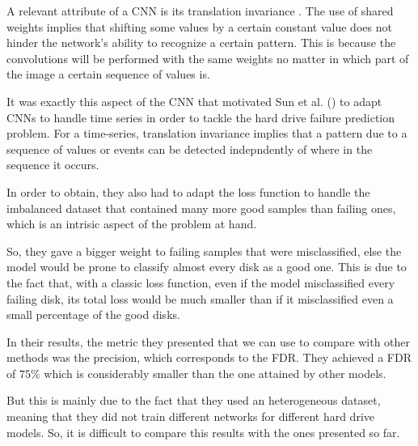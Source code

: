 A relevant attribute of a CNN is its translation invariance \cite{kayhan2020translation}.
The use of shared weights implies that shifting some values by a certain constant value does not hinder the network's ability to recognize a certain pattern.
This is because the convolutions will be performed with the same weights no matter in which part of the image a certain sequence of values is.

It was exactly this aspect of the CNN that motivated Sun et al. (\cite{sun2019system}) to adapt CNNs to handle time series in order to tackle the hard drive failure prediction problem.
For a time-series, translation invariance implies that a pattern due to a sequence of values or events can be detected indepndently of where in the sequence it occurs.

In order to obtain, they also had to adapt the loss function to handle the imbalanced dataset that contained many more good samples than failing ones, which is an intrisic aspect of the problem at hand.

So, they gave a bigger weight to failing samples that were misclassified, else the model would be prone to classify almost every disk as a good one.
This is due to the fact that, with a classic loss function, even if the model misclassified every failing disk, its total loss would be much smaller than if it misclassified even a small percentage of the good disks.

In their results, the metric they presented that we can use to compare with other methods was the precision, which corresponds to the FDR.
They achieved a FDR of $75\%$ which is considerably smaller than the one attained by other models.

But this is mainly due to the fact that they used an heterogeneous dataset, meaning that they did not train different networks for different hard drive models.
So, it is difficult to compare this results with the ones presented so far.